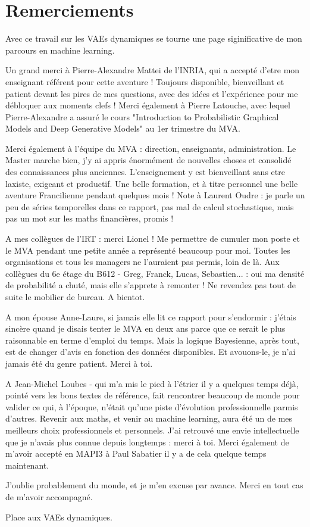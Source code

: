 \chapter{Remerciements}\label{sec:Remerciements}

Avec ce travail sur les VAEs dynamiques se tourne une page siginificative de mon parcours en machine learning.

Un grand merci à Pierre-Alexandre Mattei de l'INRIA, qui a accepté d'etre mon enseignant référent pour cette aventure !
Toujours disponible, bienveillant et patient devant les pires de mes questions, avec des idées et l'expérience 
pour me débloquer aux moments clefs ! Merci également à Pierre Latouche, avec lequel Pierre-Alexandre a assuré 
le cours "Introduction to Probabilistic Graphical Models and Deep Generative Models" au 1er trimestre du MVA.

Merci également à l'équipe du MVA : direction, enseignants, administration. Le Master marche bien, j'y ai appris 
énormément de nouvelles choses et consolidé des connaissances plus anciennes. L'enseignement y est bienveillant sans 
etre laxiste, exigeant et productif. Une belle formation, et à titre personnel une belle aventure Francilienne 
pendant quelques mois ! Note à Laurent Oudre : je parle un peu de séries temporelles dans ce rapport, pas mal de 
calcul stochastique, mais pas un mot sur les maths financières, promis !

A mes collègues de l'IRT : merci Lionel ! Me permettre de cumuler mon poste et le MVA pendant une petite année a 
représenté beaucoup pour moi. Toutes les organisations et tous les managers ne l'auraient pas permis, loin de là. 
Aux collègues du 6e étage du B612 - Greg, Franck, Lucas, Sebastien... : oui ma densité de probabilité a chuté, 
mais elle s'apprete à remonter ! Ne revendez pas tout de suite le mobilier de bureau. A bientot.

A mon épouse Anne-Laure, si jamais elle lit ce rapport pour s'endormir : j'étais sincère quand je disais tenter le MVA en deux ans 
parce que ce serait le plus raisonnable en terme d'emploi du temps. Mais la logique Bayesienne, après tout, est de changer d'avis 
en fonction des données disponibles. Et avouons-le, je n'ai jamais été du genre patient. Merci à toi.

A Jean-Michel Loubes - qui m'a mis le pied à l'étrier il y a quelques temps déjà, pointé vers les bons textes de référence, fait 
rencontrer beaucoup de monde pour valider ce qui, à l'époque, n'était qu'une piste d'évolution professionnelle parmis d'autres. 
Revenir aux maths, et venir au machine learning, aura été un de mes meilleurs choix professionnels et personnels. J'ai retrouvé une envie 
intellectuelle que je n'avais plus connue depuis longtemps : merci à toi. 
Merci également de m'avoir accepté en MAPI3 à Paul Sabatier il y a de cela quelque temps maintenant.

J'oublie probablement du monde, et je m'en excuse par avance. Merci en tout cas de m'avoir accompagné.

Place aux VAEs dynamiques.